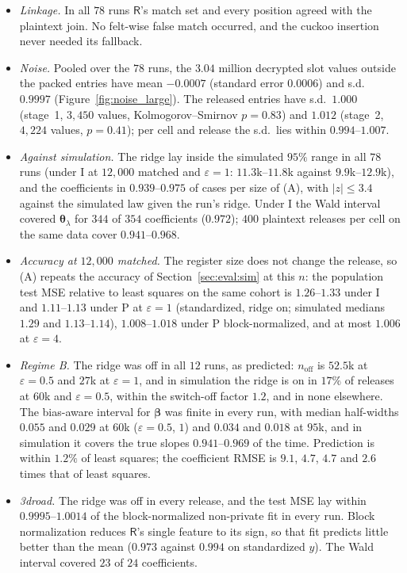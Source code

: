 \documentclass[11pt]{article}
\theoremstyle{definition}
\theoremstyle{plain}
\newcommand{\bbeta}{\boldsymbol{\beta}}
\newcommand{\btheta}{\boldsymbol{\theta}}
\newcommand{\Party}[1]{\textsf{#1}}
\newcommand{\Rp}{\Party{R}}
\begin{document}
\begin{itemize}[noitemsep]
  \item \emph{Linkage.} In all $78$ runs $\Rp$'s match set and every position agreed with the plaintext join. No felt-wise false match occurred, and the cuckoo insertion never needed its fallback.
  \item \emph{Noise.} Pooled over the $78$ runs, the $3.04$ million decrypted slot values outside the packed entries have mean $-0.0007$ (standard error $0.0006$) and s.d.\ $0.9997$ (Figure~\ref{fig:noise_large}). The released entries have s.d.\ $1.000$ (stage~1, $3{,}450$ values, Kolmogorov--Smirnov $p = 0.83$) and $1.012$ (stage~2, $4{,}224$ values, $p = 0.41$); per cell and release the s.d.\ lies within $0.994$--$1.007$.
  \item \emph{Against simulation.} The ridge lay inside the simulated $95\%$ range in all $78$ runs (under I at $12{,}000$ matched and $\varepsilon = 1$: $11.3$k--$11.8$k against $9.9$k--$12.9$k), and the coefficients in $0.939$--$0.975$ of cases per size of (A), with $|z| \le 3.4$ against the simulated law given the run's ridge. Under I the Wald interval covered $\btheta_\lambda$ for $344$ of $354$ coefficients ($0.972$); $400$ plaintext releases per cell on the same data cover $0.941$--$0.968$.
  \item \emph{Accuracy at $12{,}000$ matched.} The register size does not change the release, so (A) repeats the accuracy of Section~\ref{sec:eval:sim} at this $n$: the population test MSE relative to least squares on the same cohort is $1.26$--$1.33$ under I and $1.11$--$1.13$ under P at $\varepsilon = 1$ (standardized, ridge on; simulated medians $1.29$ and $1.13$--$1.14$), $1.008$--$1.018$ under P block-normalized, and at most $1.006$ at $\varepsilon = 4$.
  \item \emph{Regime B.} The ridge was off in all $12$ runs, as predicted: $n_{\mathrm{off}}$ is $52.5$k at $\varepsilon = 0.5$ and $27$k at $\varepsilon = 1$, and in simulation the ridge is on in $17\%$ of releases at $60$k and $\varepsilon = 0.5$, within the switch-off factor $1.2$, and in none elsewhere. The bias-aware interval for $\bbeta$ was finite in every run, with median half-widths $0.055$ and $0.029$ at $60$k ($\varepsilon = 0.5$, $1$) and $0.034$ and $0.018$ at $95$k, and in simulation it covers the true slopes $0.941$--$0.969$ of the time. Prediction is within $1.2\%$ of least squares; the coefficient RMSE is $9.1$, $4.7$, $4.7$ and $2.6$ times that of least squares.
  \item \emph{3droad.} The ridge was off in every release, and the test MSE lay within $0.9995$--$1.0014$ of the block-normalized non-private fit in every run. Block normalization reduces $\Rp$'s single feature to its sign, so that fit predicts little better than the mean ($0.973$ against $0.994$ on standardized $y$). The Wald interval covered $23$ of $24$ coefficients.
\end{itemize}
\end{document}
